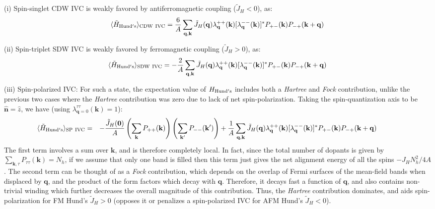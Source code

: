 \documentclass[aps,pra,twocolumn,superscriptaddress,10pt,article,nofootinbib,showpacs,longbibliography]{revtex4-1}
\def \k{{\mathbf k}}
\def \n{{\mathbf n}}
\def \q{{\mathbf q}}
\def \beq{\begin{eqnarray}}
\def \eeq{\end{eqnarray}}
\begin{document}
(i) Spin-singlet CDW IVC is weakly favored by antiferromagnetic coupling  ($\tilde{J}_H < 0$), as:
\beq
\langle \tilde{H}_{\rm Hund's} \rangle_{\rm CDW ~IVC} = \frac{6}{A} \sum_{\q, \k} \tilde{J}_H(\q) \lambda^{++}_{\q}(\k) [\lambda^{--}_{\q}(\k)]^* P_{+-}(\k) P_{-+}(\k + \q) 
\eeq

(ii) Spin-triplet SDW IVC is weakly favored by ferromagnetic coupling ($\tilde{J}_H > 0$), as:  
\beq
\langle \tilde{H}_{\rm Hund's} \rangle_{\rm SDW ~IVC} = -\frac{2}{A} \sum_{\q, \k} \tilde{J}_H(\q) \lambda^{++}_{\q}(\k) [\lambda^{--}_{\q}(\k)]^* P_{+-}(\k) P_{-+}(\k + \q) 
\eeq

(iii) Spin-polarized IVC: For such a state, the expectation value of $H_{\rm Hund's}$ includes both a \textit{Hartree} and \textit{Fock} contribution, unlike the previous two cases where the \textit{Hartree} contribution was zero due to lack of net spin-polarization. 
Taking the spin-quantization axis to be $\hat{\n} = \hat{z}$, we have (using $\lambda^{\tau \tau}_{\q = 0}(\k) = 1$):
\beq
\langle \tilde{H}_{\rm Hund's} \rangle_{\rm SP ~ IVC} &=& - \frac{\tilde{J}_H(\mathbf{0})}{A} \left( \sum_{\k} P_{++}(\k) \right)  \left(\sum_{\k^\prime} P_{--}(\k^\prime) \right)  + \frac{1}{A} \sum_{\q, \k} \tilde{J}_H(\q) \lambda^{++}_{\q}(\k) [\lambda^{--}_{\q}(\k)]^* P_{+-}(\k) P_{-+}(\k + \q) ~~~~~~~~~ 
\eeq
The first term involves a sum over $\k$, and is therefore completely local. 
In fact, since the total number of dopants is given by $\sum_{\k,\tau} P_{\tau \tau}(\k) = N_h$, if we assume that only one band is filled then this term just gives the net alignment energy of all the spins $- J_H N_h^2/4A$. 
The second term can be thought of as a \textit{Fock} contribution, which depends on the overlap of Fermi surfaces of the mean-field bands when displaced by $\q$, and the product of the form factors which decay with $\q$. 
Therefore, it decays fast a function of $\q$, and also contains non-trivial winding which further decreases the overall magnitude of this contribution. 
Thus, the \textit{Hartree} contribution dominates, and aids spin-polarization for FM Hund's $\tilde{J}_H > 0$ (opposes it or penalizes a spin-polarized IVC for AFM Hund's $\tilde{J}_H  < 0$). 
\end{document}
